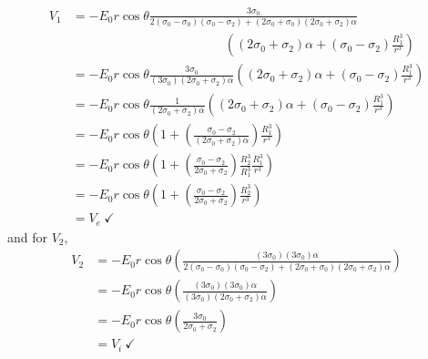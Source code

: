  \begin{displaymath}
    \begin{split}
    V_1
    &=
    -E_0r\cos\theta\frac{3\sigma_0}{2 (\sigma_0-\sigma_0)(\sigma_0 - \sigma_2) + (2\sigma_0 + \sigma_0)(2\sigma_0 + \sigma_2)\alpha}
    \\& \quad\quad\quad\quad\quad\quad\quad\quad\quad\quad\quad\quad \left(
            (2\sigma_0 + \sigma_2)\alpha +
             (\sigma_0 - \sigma_2) \frac{R_1^3}{r^3}
    \right)
    \\
        &=
    -E_0r\cos\theta\frac{3\sigma_0}{(3\sigma_0)(2\sigma_0 + \sigma_2)\alpha}
    \left(
            (2\sigma_0 + \sigma_2)\alpha +
             (\sigma_0 - \sigma_2) \frac{R_1^3}{r^3}
    \right)
    \\
        &=
    -E_0r\cos\theta\frac{1}{(2\sigma_0 + \sigma_2)\alpha}
    \left(
            (2\sigma_0 + \sigma_2)\alpha +
             (\sigma_0 - \sigma_2) \frac{R_1^3}{r^3}
    \right)
    \\
            &=
    -E_0r\cos\theta
    \left(
            1 +
             \left(\frac{\sigma_0 - \sigma_2}{(2\sigma_0 + \sigma_2)\alpha} \right) \frac{R_1^3}{r^3}
    \right)
    \\
    &=
    -E_0r\cos\theta
    \left(
            1 +
             \left(\frac{\sigma_0 - \sigma_2}{2\sigma_0 + \sigma_2} \right)\frac{R_2^3}{R_1^3} \frac{R_1^3}{r^3}
    \right)
    \\
        &=
    -E_0r\cos\theta
    \left(
            1 +
             \left(\frac{\sigma_0 - \sigma_2}{2\sigma_0 + \sigma_2} \right)\frac{R_2^3}{r^3}
    \right)
    \\
    &=
    V_e ~\checkmark
    \end{split}
 \end{displaymath}
and for $V_2$,
\begin{displaymath}
    \begin{split}
        V_2
        &=-E_0 r\cos\theta
         \left(
        \frac{
        (3 \sigma_0) (3\sigma_0)\alpha
        }
        {
        2 (\sigma_0-\sigma_0)(\sigma_0 - \sigma_2) + (2\sigma_0 + \sigma_0)(2\sigma_0 + \sigma_2)\alpha
        }
        \right)
        \\
        &=-E_0 r\cos\theta
         \left(
        \frac{
        (3 \sigma_0) (3\sigma_0)\alpha
        }
        {
        (3\sigma_0)(2\sigma_0 + \sigma_2)\alpha
        }
        \right)
        \\
        &=-E_0 r\cos\theta
         \left(
        \frac{
        3 \sigma_0
        }
        {
        2\sigma_0 + \sigma_2
        }
        \right)
        \\
        &=V_i ~\checkmark
    \end{split}
\end{displaymath}

